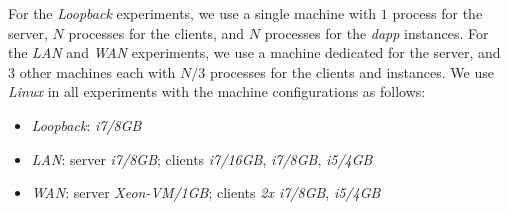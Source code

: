 \documentclass[sigplan,screen]{acmart}
\newcommand{\dapp}{\emph{dapp}\xspace}
\begin{document}
For the \emph{Loopback} experiments, we use a single machine with $1$ process
for the server, $N$ processes for the clients, and $N$ processes for the \dapp
instances.
For the \emph{LAN} and \emph{WAN} experiments, we use a machine
dedicated for the server, and $3$ other machines each with $N/3$ processes for
the clients and instances.
%
We use \emph{Linux} in all experiments with the machine configurations as
follows:
%
\begin{itemize}
    \item \emph{Loopback}: \emph{i7/8GB}
    \item \emph{LAN}:
            server \emph{i7/8GB};
            clients \emph{i7/16GB}, \emph{i7/8GB}, \emph{i5/4GB}
    \item \emph{WAN}:
            server \emph{Xeon-VM/1GB};
            clients \emph{2x i7/8GB}, \emph{i5/4GB}
\end{itemize}

\end{document}
